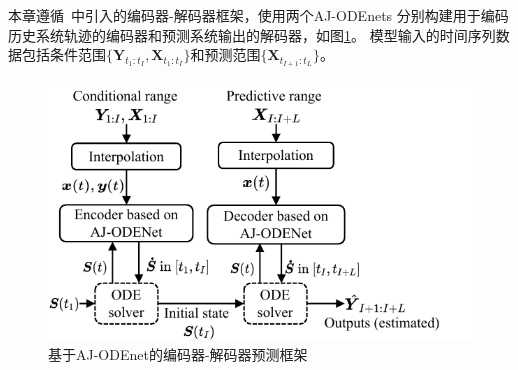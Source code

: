 
本章遵循~\cite{du2020multivariate,yuan2020dual}中引入的编码器-解码器框架，使用两个AJ-ODEnets
分别构建用于编码历史系统轨迹的编码器和预测系统输出的解码器，如图\ref{fig:AJ-ODEnet_framework}。
模型输入的时间序列数据包括条件范围$\{{\boldsymbol{Y}}_{t_{1}:t_{I}}, {\boldsymbol {X}}_{t_{1}:t_{I}}\}$和预测范围$\{{\boldsymbol {X}}_{t_{I+1}:t_{L}}\}$。
\begin{figure}[htb]
    \centering
    \includegraphics[width=\linewidth]{figures/chapter4/Jump-ODEnet_flow.pdf}
     \caption{基于AJ-ODEnet的编码器-解码器预测框架}
    \label{fig:AJ-ODEnet_framework}
\end{figure}

